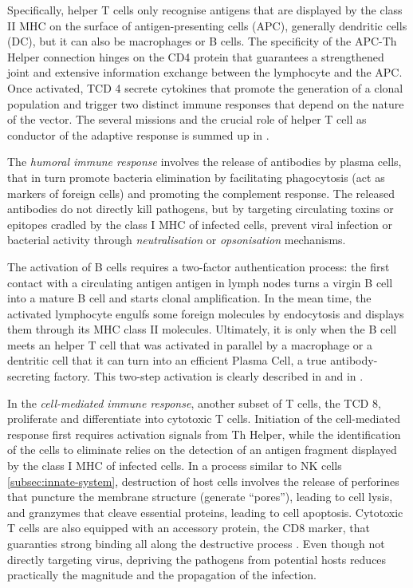 \begin{enumerate}[label=(\alph*)]
Specifically, helper T cells only recognise antigens that are displayed by the class II MHC on the surface of antigen-presenting cells (APC), generally dendritic cells (DC), but it can also be macrophages or B cells. The specificity of the APC-Th Helper connection hinges on the CD4 protein that guarantees a strengthened joint and extensive information exchange between the lymphocyte and the APC. Once activated, TCD 4 secrete cytokines that promote the generation of a clonal population  and trigger two distinct immune responses that depend on the nature of the vector. The several missions and the crucial role of helper T cell as conductor of the adaptive response is summed up in \autocite[Figure 18, Chapter 43]{campbell_etal20}.

The \textit{humoral immune response} involves the release of antibodies by plasma cells, that in turn promote bacteria elimination by facilitating phagocytosis (act as markers of foreign cells) and promoting the complement response. The released antibodies do not directly kill pathogens, but by targeting circulating toxins or epitopes cradled by the class I MHC of infected cells, prevent viral infection or bacterial activity through \textit{\gls{neutralisation}} or \textit{opsonisation} mechanisms. 

The activation of B cells requires a two-factor authentication process: the first contact with a circulating antigen antigen in lymph nodes turns a virgin B cell into a mature B cell and starts clonal amplification. In the mean time, the activated lymphocyte engulfs some foreign molecules by endocytosis and displays them through its MHC class II molecules. Ultimately, it is only when the B cell meets an helper T cell that was activated in parallel by a macrophage or a dentritic cell that it can turn into an efficient Plasma Cell, a true antibody-secreting factory. This two-step activation is clearly described in \autocite[Figure 19, Chapter 43]{campbell_etal20} and in \autocite[Figures 1 and 2, Chapter 21]{dettmer21}. 

In the \textit{cell-mediated immune response}, another subset of T cells, the TCD 8, proliferate and differentiate into cytotoxic T cells. Initiation of the cell-mediated response first requires activation signals from Th Helper, while the identification of the cells to eliminate relies on the detection of an antigen fragment displayed by the class I MHC of infected cells. In a process similar to NK cells \ref{subsec:innate-system}, destruction of host cells involves the release of perforines that puncture the membrane structure (generate \enquote{pores}), leading to cell lysis, and granzymes that cleave essential proteins, leading to cell apoptosis. Cytotoxic T cells are also equipped with an accessory protein, the CD8 marker, that guaranties strong binding all along the destructive process \autocite[Figure 22, Chapter 43]{campbell_etal20}. Even though not directly targeting virus, depriving the pathogens from potential hosts reduces practically the magnitude and the propagation of the infection. 




\end{enumerate}
